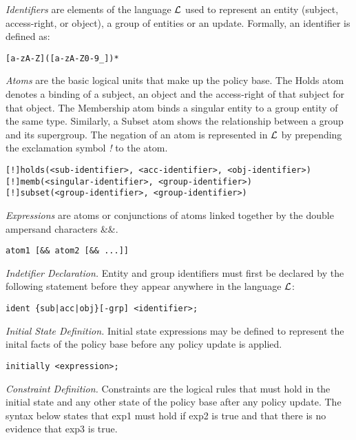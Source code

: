 \documentclass{llncs}
\begin{document}
    \emph{Identifiers} are elements of the language $\cal{L}$ used to represent
    an entity (subject, access-right, or object), a group of entities or an
    update. Formally, an identifier is defined as:

    \begin{verbatim}[a-zA-Z]([a-zA-Z0-9_])*\end{verbatim}

    \emph{Atoms} are the basic logical units that make up the policy base.
    The Holds atom denotes a binding of a subject, an object and the
    access-right of that subject for that object. The Membership atom binds
    a singular entity to a group entity of the same type. Similarly, a Subset
    atom shows the relationship between a group and its supergroup. The
    negation of an atom is represented in $\cal{L}$ by prepending the 
    exclamation symbol \emph{!} to the atom.

    \begin{verbatim}[!]holds(<sub-identifier>, <acc-identifier>, <obj-identifier>)
[!]memb(<singular-identifier>, <group-identifier>)
[!]subset(<group-identifier>, <group-identifier>)\end{verbatim}

    \emph{Expressions} are atoms or conjunctions of atoms linked together by
    the double ampersand characters \&\&.

    \begin{verbatim}atom1 [&& atom2 [&& ...]]\end{verbatim}

    \emph{Indetifier Declaration.} Entity and group identifiers must first be
    declared by the following statement before they appear anywhere in the
    language $\cal{L}$:

    \begin{verbatim}ident {sub|acc|obj}[-grp] <identifier>;\end{verbatim}

    \emph{Initial State Definition.} Initial state expressions may be defined
    to represent the inital facts of the policy base before any policy update
    is applied.

    \begin{verbatim}initially <expression>;\end{verbatim}

    \emph{Constraint Definition.} Constraints are the logical rules that must
    hold in the initial state and any other state of the policy base after
    any policy update. The syntax below states that exp1 must hold if exp2 is 
    true and that there is no evidence that exp3 is true.
\end{document}
